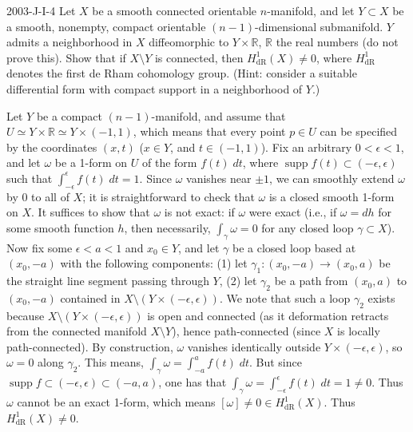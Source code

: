 \documentclass{article}
\begin{document}
	\begin{prb}{2003-J-I-4}
		Let $X$ be a smooth connected orientable $n$-manifold, and let $Y \subset X$ be a smooth, nonempty, compact orientable $(n-1)$-dimensional submanifold. $Y$ admits a neighborhood in $X$ diffeomorphic to $Y \times \mathbb{R}$, $\mathbb{R}$ the real numbers (do not prove this). Show that if $X \setminus Y$ is connected, then $H^{1}_{\text{dR}}(X) \neq 0$, where $H^{1}_{\text{dR}}$ denotes the first de Rham cohomology group. (Hint: consider a suitable differential form with compact support in a neighborhood of $Y$.) 
	\end{prb}
		Let $Y$ be a compact $(n -1)$-manifold, and assume that $U \simeq Y \times \mathbb{R} \simeq Y \times (-1,1)$, which means that every point $p \in U$ can be specified by the coordinates $(x, t)$ ($x \in Y$, and $t \in (-1,1)$). Fix an arbitrary $0 < \epsilon < 1$, and let $\omega$ be a 1-form on $U$ of the form $f(t)\;dt$, where $\operatorname{supp}{f(t)} \subset (-\epsilon, \epsilon)$ such that $\int_{-\epsilon}^{\epsilon}f(t)\;dt = 1$. Since $\omega$ vanishes near $\pm 1$, we can smoothly extend $\omega$ by 0 to all of $X$; it is straightforward to check that $\omega$ is a closed smooth 1-form on $X$. It suffices to show that $\omega$ is not exact: if $\omega$ were exact (i.e., if $\omega = dh$ for some smooth function $h$, then necessarily, $\int_{\gamma}\omega = 0$ for any closed loop $\gamma \subset X$). Now fix some $\epsilon < a < 1$ and $x_{0} \in Y$, and let $\gamma$ be a closed loop based at $(x_{0}, -a)$ with the following components: (1) let $\gamma_{1}: (x_{0}, -a) \to (x_{0}, a)$ be the straight line segment passing through $Y$, (2) let $\gamma_2$ be a path from $(x_0, a)$ to $(x_0, -a)$ contained in $X \setminus (Y \times (-\epsilon, \epsilon))$. We note that such a loop $\gamma_2$ exists because $X \setminus (Y \times (-\epsilon, \epsilon))$ is open and connected (as it deformation retracts from the connected manifold $X \setminus Y$), hence path-connected (since $X$ is locally path-connected). By construction, $\omega$ vanishes identically outside $Y \times (-\epsilon, \epsilon)$, so $\omega = 0$ along $\gamma_2$. This means, $\int_{\gamma}\omega = \int_{-a}^{a}f(t)\;dt$. But since $\operatorname{supp}{f} \subset (-\epsilon, \epsilon) \subset (-a,a)$, one has that $\int_{\gamma}\omega = \int_{-\epsilon}^{\epsilon}f(t)\;dt = 1 \neq 0$. Thus $\omega$ cannot be an exact 1-form, which means $[\omega] \neq 0\in H^{1}_{\text{dR}}(X)$. Thus $H^{1}_{\text{dR}}(X) \neq 0$. 
	
\end{document}
